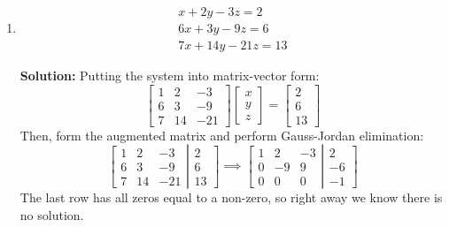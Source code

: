 \documentclass[letterpaper, 11pt]{article}
\begin{document}
\begin{enumerate}
\item
\begin{gather*}
x + 2y - 3z = 2\\
6x + 3y - 9 z = 6 \\
7x  + 14y - 21z = 13 
\end{gather*}
\par \textbf{Solution:} Putting the system into matrix-vector form:
\[ \left[ \begin{array}{ccc} 1 & 2 & -3 \\ 6 & 3 & -9 \\ 7 & 14 & -21 \end{array} \right] \left[ \begin{array}{c} x \\ y\\ z\end{array} \right] 
= \left[ \begin{array}{c} 2 \\ 6 \\ 13 \end{array} \right] \]
Then, form the augmented matrix and perform Gauss-Jordan elimination:
\[ \left[ \begin{array}{ccc} 1 & 2 & -3 \\ 6 & 3 & -9 \\ 7 & 14 & -21 \end{array} \right| \left. \begin{array}{c} 2 \\ 6 \\ 13 \end{array} \right] \implies 
 \left[ \begin{array}{ccc} 1 & 2 & -3 \\ 0 & -9 & 9 \\ 0 & 0 & 0 \end{array} \right| \left. \begin{array}{c} 2 \\ -6 \\ -1 \end{array} \right] 
\]
The last row has all zeros equal to a non-zero, so right away we know there is no solution. 


\end{enumerate}
\end{document}
